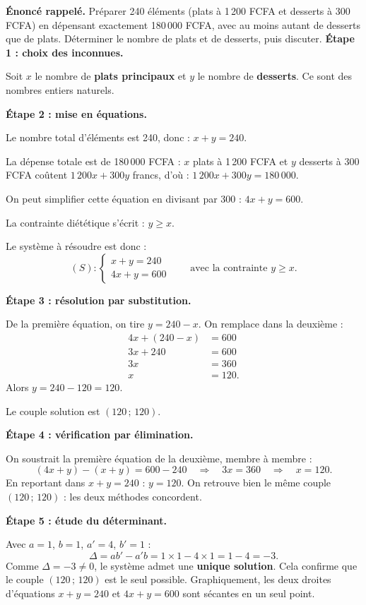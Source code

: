 \documentclass[11pt]{article}
\begin{document}
\begin{exoresolu}
\textbf{Énoncé rappelé.} Préparer 240 éléments (plats à 1\,200 FCFA et desserts à 300 FCFA) en dépensant exactement 180\,000 FCFA, avec au moins autant de desserts que de plats. Déterminer le nombre de plats et de desserts, puis discuter.
\tcblower
\textbf{Étape 1 : choix des inconnues.}\par
Soit $x$ le nombre de \textbf{plats principaux} et $y$ le nombre de \textbf{desserts}. Ce sont des nombres entiers naturels.

\textbf{Étape 2 : mise en équations.}\par
Le nombre total d'éléments est 240, donc : $x + y = 240$.\par
La dépense totale est de 180\,000 FCFA : $x$ plats à 1\,200 FCFA et $y$ desserts à 300 FCFA coûtent $1\,200x + 300y$ francs, d'où : $1\,200x + 300y = 180\,000$.\par
On peut simplifier cette équation en divisant par 300 : $4x + y = 600$.\par
La contrainte diététique s'écrit : $y \geq x$.\par
Le système à résoudre est donc :
\[ (S) : \begin{cases} x + y = 240 \\ 4x + y = 600 \end{cases} \qquad \text{avec la contrainte } y \geq x. \]

\textbf{Étape 3 : résolution par substitution.}\par
De la première équation, on tire $y = 240 - x$. On remplace dans la deuxième :
\begin{align*}
4x + (240 - x) &= 600 \\
3x + 240 &= 600 \\
3x &= 360 \\
x &= 120.
\end{align*}
Alors $y = 240 - 120 = 120$.\par
Le couple solution est $(120\,;\,120)$.

\textbf{Étape 4 : vérification par élimination.}\par
On soustrait la première équation de la deuxième, membre à membre :
\[ (4x + y) - (x + y) = 600 - 240 \quad\Longrightarrow\quad 3x = 360 \quad\Longrightarrow\quad x = 120. \]
En reportant dans $x + y = 240$ : $y = 120$. On retrouve bien le même couple $(120\,;\,120)$ : les deux méthodes concordent.

\textbf{Étape 5 : étude du déterminant.}\par
Avec $a = 1$, $b = 1$, $a' = 4$, $b' = 1$ :
\[ \Delta = ab' - a'b = 1 \times 1 - 4 \times 1 = 1 - 4 = -3. \]
Comme $\Delta = -3 \neq 0$, le système admet une \textbf{unique solution}. Cela confirme que le couple $(120\,;\,120)$ est le seul possible. Graphiquement, les deux droites d'équations $x + y = 240$ et $4x + y = 600$ sont sécantes en un seul point.


\end{exoresolu}
\end{document}

